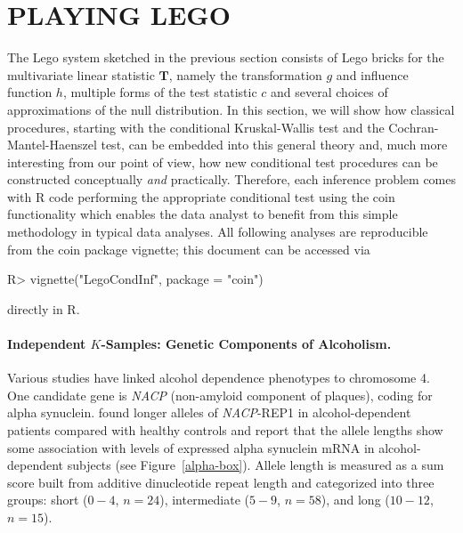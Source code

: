 \documentclass{article}
\newcommand{\Rpackage}[1]{{\normalfont\fontseries{b}\selectfont #1}}
\newcommand{\RR}{\textsf{R}}
\newcommand{\T}{\mathbf{T}}
\newenvironment{Schunk}{}{}
\begin{document}
\section{PLAYING LEGO \label{play}}

The Lego system sketched in the previous section consists of Lego bricks for 
the multivariate linear statistic $\T$, namely the transformation $g$ and
influence function $h$, multiple forms of the test statistic $c$ and several choices
of approximations of the null distribution. In this section, we will show how
classical procedures, starting with the conditional Kruskal-Wallis test and
the Cochran-Mantel-Haenszel test, can be embedded into this general theory
and, much more interesting from our point of view, how new conditional test
procedures can be constructed conceptually \textit{and} practically. 
Therefore, each inference problem comes with \RR{} code performing the
appropriate conditional test using the \Rpackage{coin} functionality 
which enables the data analyst to benefit from this
simple methodology in typical data analyses. All following analyses are
reproducible from the \Rpackage{coin} package vignette; this document 
can be accessed via
\begin{Schunk}
\begin{Sinput}
R> vignette("LegoCondInf", package = "coin")
\end{Sinput}
\end{Schunk}
directly in \RR{}.

\paragraph{Independent $K$-Samples: Genetic Components of Alcoholism.}

Various studies have linked alcohol dependence phenotypes to chromosome 4.  
One candidate gene is \textit{NACP} (non-amyloid component of plaques), 
coding for alpha synuclein. 
\cite{Boenscheta2005} found longer alleles of
\textit{NACP}-REP1 in alcohol-dependent patients compared with healthy controls
and report that the allele lengths show some
association with levels of expressed alpha synuclein mRNA in
alcohol-dependent subjects (see Figure~\ref{alpha-box}). Allele length is
measured as a sum score built from additive dinucleotide repeat length and
categorized into three groups: short ($0-4$, $n = 24$), intermediate ($5-9$,
$n = 58$), and long ($10-12$, $n = 15$).
\end{document}
